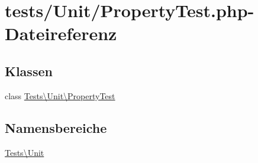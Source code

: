 \hypertarget{PropertyTest_8php}{}\section{tests/\+Unit/\+Property\+Test.php-\/\+Dateireferenz}
\label{PropertyTest_8php}
\subsection*{Klassen}
\begin{DoxyCompactItemize}
\item 
class \hyperlink{classTests_1_1Unit_1_1PropertyTest}{Tests\textbackslash{}\+Unit\textbackslash{}\+Property\+Test}
\end{DoxyCompactItemize}
\subsection*{Namensbereiche}
\begin{DoxyCompactItemize}
\item 
 \hyperlink{namespaceTests_1_1Unit}{Tests\textbackslash{}\+Unit}
\end{DoxyCompactItemize}
